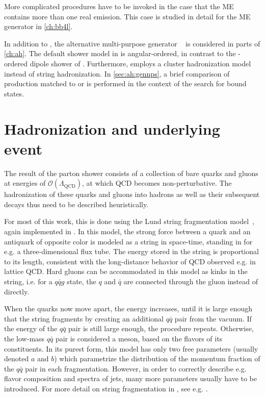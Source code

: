 More complicated procedures have to be invoked in the case that the ME contains more than one real emission. This case is studied in detail for the ME generator \bbfourl in \cref{ch:bb4l}.

In addition to \pythia, the alternative multi-purpose generator \herwig~\cite{Bellm:2015jjp,Bahr:2008pv} is considered in parts of \cref{ch:ah}. The default shower model in \herwig is angular-ordered, in contrast to the \pt-ordered dipole shower of \pythia. Furthermore, \herwig employs a cluster hadronization model~\cite{Webber:1983if} instead of string hadronization. In \cref{sec:ah:gennps}, a brief comparison of \ttbar production matched to \pythia or \herwig is performed in the context of the search for \ttbar bound states.



\section{Hadronization and underlying event}
\label{sec:mc:hadronization}

The result of the parton shower consists of a collection of bare quarks and gluons at energies of $\mathcal{O}(\Lambda_{\mathrm{QCD}})$, at which QCD becomes non-perturbative. The hadronization of these quarks and gluons into hadrons as well as their subsequent decays thus need to be described heuristically.

For most of this work, this is done using the Lund string fragmentation model~\cite{Andersson:1983ia,Sjostrand:1984ic}, again implemented in \pythia. In this model, the strong force between a quark and an antiquark of opposite color is modeled as a string in space-time, standing in for e.g. a three-dimensional flux tube. The energy stored in the string is proportional to its length, consistent with the long-distance behavior of QCD observed e.g. in lattice QCD. Hard gluons can be accommodated in this model as kinks in the string, i.e. for a $q\bar{q}g$ state, the $q$ and $\bar{q}$ are connected through the gluon instead of directly.

When the quarks now move apart, the energy increases, until it is large enough that the string fragments by creating an additional $q\bar{q}$ pair from the vacuum. If the energy of the $q\bar{q}$ pair is still large enough, the procedure repeats. Otherwise, the low-mass $q\bar{q}$ pair is considered a meson, based on the flavors of its constituents. In its purest form, this model has only two free parameters (usually denoted $a$ and $b$) which parametrize the distribution of the momentum fraction of the $q\bar{q}$ pair in each fragmentation. However, in order to correctly describe e.g. flavor composition and \pt spectra of jets, many more parameters usually have to be introduced. For more detail on string fragmentation in \pythia, see e.g. .

